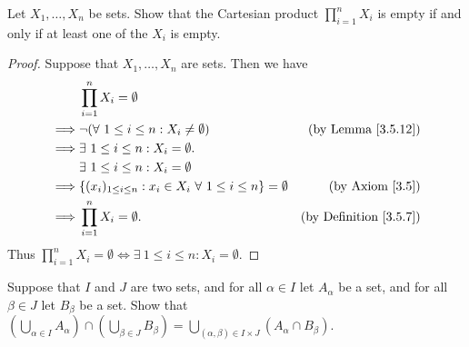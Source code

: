 \begin{exercise}\label{ex 3.5.8}
Let \(X_1, \dots, X_n\) be sets.
Show that the Cartesian product \(\prod_{i = 1}^n X_i\) is empty if and only if at least one of the \(X_i\) is empty.
\end{exercise}

\begin{proof}
Suppose that \(X_1, \dots, X_n\) are sets.
Then we have
\begin{align*}
& \prod_{i = 1}^n X_i = \emptyset \\
\implies & \lnot (\forall\ 1 \leq i \leq n : X_i \neq \emptyset) & \text{(by Lemma \ref{3.5.12})} \\
\implies & \exists\ 1 \leq i \leq n : X_i = \emptyset. \\
& \exists\ 1 \leq i \leq n : X_i = \emptyset \\
\implies & \{(x_i)_{1 \leq i \leq n} : x_i \in X_i \ \forall\ 1 \leq i \leq n\} = \emptyset & \text{(by Axiom \ref{3.5})} \\
\implies & \prod_{i = 1}^n X_i = \emptyset. & \text{(by Definition \ref{3.5.7})}
\end{align*}
Thus \(\prod_{i = 1}^n X_i = \emptyset \iff \exists\ 1 \leq i \leq n : X_i = \emptyset\).
\end{proof}

\begin{exercise}\label{ex 3.5.9}
Suppose that \(I\) and \(J\) are two sets, and for all \(\alpha \in I\) let \(A_{\alpha}\) be a set, and for all \(\beta \in J\) let \(B_{\beta}\) be a set.
Show that \((\bigcup_{\alpha \in I} A_{\alpha}) \cap (\bigcup_{\beta \in J} B_{\beta}) = \bigcup_{(\alpha, \beta) \in I \times J} (A_{\alpha} \cap B_{\beta})\).
\end{exercise}

